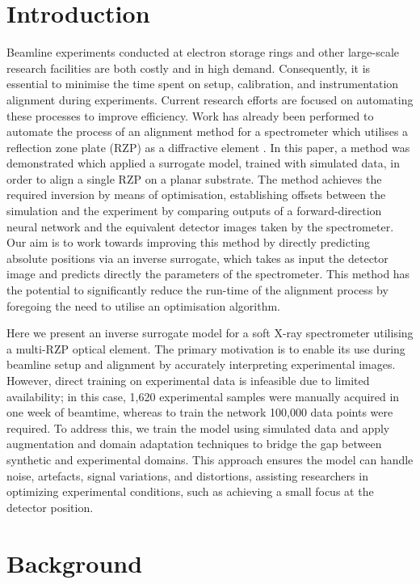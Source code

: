 \documentclass{iopconfser}
\begin{document}
\section{Introduction}
Beamline experiments conducted at electron storage rings and other large-scale research facilities are both costly and in high demand. Consequently, it is essential to minimise the time spent on setup, calibration, and instrumentation alignment during experiments. Current research efforts are focused on automating these processes to improve efficiency. Work has already been performed to automate the process of an alignment method for a spectrometer which utilises a reflection zone plate (RZP) as a diffractive element \cite{Feuer-Forson:ys5108}. In this paper, a method was demonstrated which applied a surrogate model, trained with simulated data, in order to align a single RZP on a planar substrate. The method achieves the required inversion by means of optimisation, establishing offsets between the simulation and the experiment by comparing outputs of a forward-direction neural network and the equivalent detector images taken by the spectrometer. Our aim is to work towards improving this method by directly predicting absolute positions via an inverse surrogate, which takes as input the detector image and predicts directly the parameters of the spectrometer. This method has the potential to significantly reduce the run-time of the alignment process by foregoing the need to utilise an optimisation algorithm.

Here we present an inverse surrogate model for a soft X-ray spectrometer utilising a multi-RZP optical element. The primary motivation is to enable its use during beamline setup and alignment by accurately interpreting experimental images. However, direct training on experimental data is infeasible due to limited availability; in this case, 1,620 experimental samples were manually acquired in one week of beamtime, whereas to train the network 100,000 data points were required. To address this, we train the model using simulated data and apply augmentation and domain adaptation techniques \cite{2022GloTP, Csurka2017, 8099799} to bridge the gap between synthetic and experimental domains. This approach ensures the model can handle noise, artefacts, signal variations, and distortions, assisting researchers in optimizing experimental conditions, such as achieving a small focus at the detector position.

\section{Background}
\end{document}
